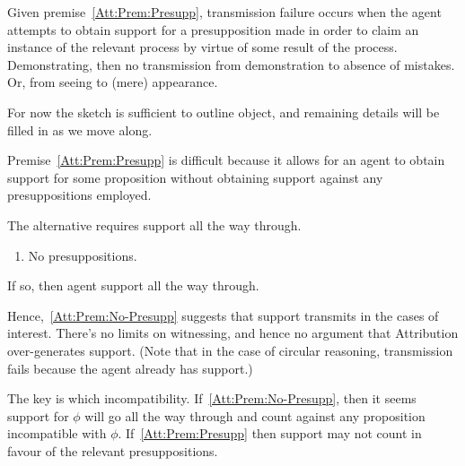 \documentclass[10pt]{article}
\newcommand{\AR}[0]{\textsf{Attribution}}
\begin{document}
\begin{note}
  Given premise~\ref{Att:Prem:Presupp}, transmission failure occurs when the agent attempts to obtain support for a presupposition made in order to claim an instance of the relevant process by virtue of some result of the process.
  Demonstrating, then no transmission from demonstration to absence of mistakes.
  Or, from seeing to (mere) appearance.

  For now the sketch is sufficient to outline object, and remaining details will be filled in as we move along.

  Premise~\ref{Att:Prem:Presupp} is difficult because it allows for an agent to obtain support for some proposition without obtaining support against any presuppositions employed.

  The alternative requires support all the way through.
  \begin{enumerate}[label=(\(\lnot\)A1b), ref=(\(\lnot\)A1b)]
  \item\label{Att:Prem:No-Presupp} No presuppositions.
  \end{enumerate}
  If so, then agent support all the way through.

  Hence,~\ref{Att:Prem:No-Presupp} suggests that support transmits in the cases of interest.
  There's no limits on witnessing, and hence no argument that \AR{} over-generates support.
  (Note that in the case of circular reasoning, transmission fails because the agent already has support.)

  The key is which incompatibility.
  If~\ref{Att:Prem:No-Presupp}, then it seems support for \(\phi\) will go all the way through and count against any proposition incompatible with \(\phi\).
  If~\ref{Att:Prem:Presupp} then support may not count in favour of the relevant presuppositions.
\end{note}
\end{document}
